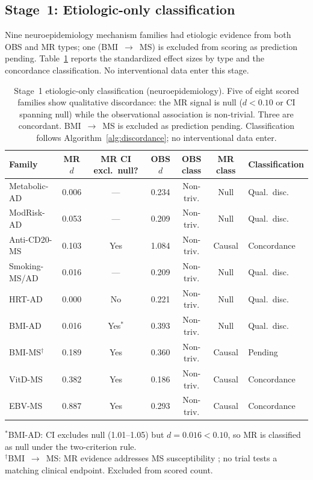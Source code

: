 \documentclass[11pt]{article}
\begin{document}
\subsection{Stage~1: Etiologic-only classification}
\label{sec:stage1}

Nine neuroepidemiology mechanism families had etiologic evidence from both OBS and MR types; one (BMI~$\to$~MS) is excluded from scoring as prediction pending. Table~\ref{tab:stage1} reports the standardized effect sizes by type and the concordance classification. No interventional data enter this stage.

\begin{table}[t]
\centering
\caption{Stage~1 etiologic-only classification (neuroepidemiology). Five of eight scored families show qualitative discordance: the MR signal is null ($d < 0.10$ or CI spanning null) while the observational association is non-trivial. Three are concordant. BMI~$\to$~MS is excluded as prediction pending. Classification follows Algorithm~\ref{alg:discordance}; no interventional data enter.}
\label{tab:stage1}
\begin{tabular}{lcccccl}
\toprule
Family & MR $d$ & MR CI excl.\ null? & OBS $d$ & OBS class & MR class & Classification \\
\midrule
Metabolic-AD & 0.006 & --- & 0.234 & Non-triv. & Null & Qual.\ disc. \\
ModRisk-AD & 0.053 & --- & 0.209 & Non-triv. & Null & Qual.\ disc. \\
Anti-CD20-MS & 0.103 & Yes & 1.084 & Non-triv. & Causal & Concordance \\
Smoking-MS/AD & 0.016 & --- & 0.209 & Non-triv. & Null & Qual.\ disc. \\
HRT-AD & 0.000 & No & 0.221 & Non-triv. & Null & Qual.\ disc. \\
BMI-AD & 0.016 & Yes$^*$ & 0.393 & Non-triv. & Null & Qual.\ disc. \\
BMI-MS$^\dagger$ & 0.189 & Yes & 0.360 & Non-triv. & Causal & Pending \\
VitD-MS & 0.382 & Yes & 0.186 & Non-triv. & Causal & Concordance \\
EBV-MS & 0.887 & Yes & 0.293 & Non-triv. & Causal & Concordance \\
\bottomrule
\end{tabular}

\vspace{1mm}
{\footnotesize $^*$BMI-AD: CI excludes null (1.01--1.05) but $d = 0.016 < 0.10$, so MR is classified as null under the two-criterion rule.\\
$^\dagger$BMI~$\to$~MS: MR evidence addresses MS susceptibility \cite{mokry2016obesity}; no trial tests a matching clinical endpoint. Excluded from scored count.}
\end{table}
\end{document}
